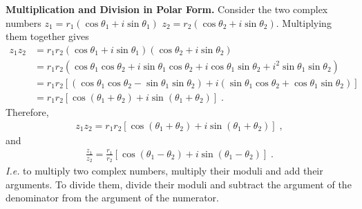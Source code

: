 \textbf{Multiplication and Division in Polar Form.} Consider the two complex numbers ${z}_{1}={r}_{1}\left(\cos {\theta }_{1}+i\sin {\theta }_{1}\right)$ ${z}_{2}={r}_{2}\left(\cos {\theta }_{2}+i\sin {\theta }_{2}\right)$. Multiplying them together gives
\begin{align*}
{z}_{1}{z}_{2} & ={r}_{1}{r}_{2}\left(\cos {\theta }_{1}+i\sin {\theta }_{1}\right)\left(\cos {\theta }_{2}+i\sin {\theta }_{2}\right)
\\[4pt]
&={r}_{1}{r}_{2}\left(\cos {\theta }_{1}\cos {\theta }_{2}+i\sin {\theta }_{1}\cos {\theta }_{2}+i\cos {\theta }_{1}\sin {\theta }_{2}+{i}^{2}\sin {\theta }_{1}\sin {\theta }_{2}\right)
\\[4pt]
&={r}_{1}{r}_{2}\left[\left(\cos {\theta }_{1}\cos {\theta }_{2}-\sin {\theta }_{1}\sin {\theta }_{2}\right)+i\left(\sin {\theta }_{1}\cos {\theta }_{2}+\cos {\theta }_{1}\sin {\theta }_{2}\right)\right]
\\[4pt]
&={r}_{1}{r}_{2}\left[\cos \left({\theta }_{1}+{\theta }_{2}\right)+i\sin \left({\theta }_{1}+{\theta }_{2}\right)\right] \; .
\end{align*}
Therefore, 
\begin{align}
\label{eq:polar_mult} {z}_{1}{z}_{2}={r}_{1}{r}_{2}\left[\cos \left({\theta }_{1}+{\theta }_{2}\right)+i\sin \left({\theta }_{1}+{\theta }_{2}\right)\right] \; ,
\end{align}
and
\begin{align}
\frac{{z}_{1}}{{z}_{2}}=\frac{{r}_{1}}{{r}_{2}}\left[\cos \left({\theta }_{1}-{\theta }_{2}\right)+i\sin \left({\theta }_{1}-{\theta }_{2}\right)\right] \; .
\end{align}
\textit{I.e.} to multiply two complex numbers, multiply their moduli and add their arguments. To divide them, divide their moduli and subtract the argument of the denominator from the argument of the numerator.


